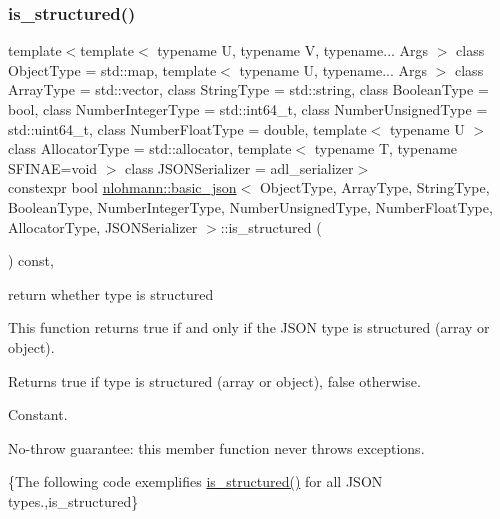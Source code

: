 \subsubsection{\texorpdfstring{is\+\_\+structured()}{is\_structured()}}
{\footnotesize\ttfamily template$<$template$<$ typename U, typename V, typename... Args $>$ class Object\+Type = std\+::map, template$<$ typename U, typename... Args $>$ class Array\+Type = std\+::vector, class String\+Type  = std\+::string, class Boolean\+Type  = bool, class Number\+Integer\+Type  = std\+::int64\+\_\+t, class Number\+Unsigned\+Type  = std\+::uint64\+\_\+t, class Number\+Float\+Type  = double, template$<$ typename U $>$ class Allocator\+Type = std\+::allocator, template$<$ typename T, typename S\+F\+I\+N\+A\+E=void $>$ class J\+S\+O\+N\+Serializer = adl\+\_\+serializer$>$ \\
constexpr bool \mbox{\hyperlink{classnlohmann_1_1basic__json}{nlohmann\+::basic\+\_\+json}}$<$ Object\+Type, Array\+Type, String\+Type, Boolean\+Type, Number\+Integer\+Type, Number\+Unsigned\+Type, Number\+Float\+Type, Allocator\+Type, J\+S\+O\+N\+Serializer $>$\+::is\+\_\+structured (\begin{DoxyParamCaption}{ }\end{DoxyParamCaption}) const\hspace{0.3cm}{\ttfamily [inline]}, {\ttfamily [noexcept]}}



return whether type is structured 

This function returns true if and only if the J\+S\+ON type is structured (array or object).

\begin{DoxyReturn}{Returns}
{\ttfamily true} if type is structured (array or object), {\ttfamily false} otherwise.
\end{DoxyReturn}
Constant.

No-\/throw guarantee\+: this member function never throws exceptions.

\{The following code exemplifies {\ttfamily \mbox{\hyperlink{classnlohmann_1_1basic__json_a9f68a0af820c3ced7f9d17851ce4c22d}{is\+\_\+structured()}}} for all J\+S\+ON types.,is\+\_\+structured\}

